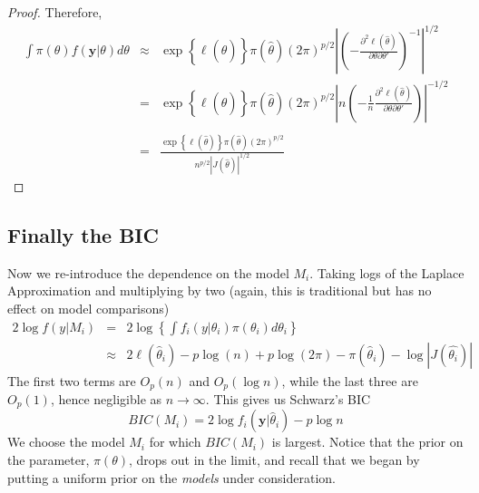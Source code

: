 \documentclass[12pt]{article}
\theoremstyle{definition}
\begin{document}
\begin{proof}
Therefore,
	\begin{eqnarray*}
		\int \pi(\theta)f(\mathbf{y}|\theta)d\theta &\approx& \exp\left\{ \ell(\hat{\theta}) \right\}\pi(\hat{\theta}) \left(2\pi\right)^{p/2}\left| \left(-\frac{\partial^2 \ell(\hat{\theta})}{\partial \theta \partial \theta'}\right)^{-1} \right|^{1/2}\\
		&=&  \exp\left\{ \ell(\hat{\theta}) \right\}\pi(\hat{\theta}) \left(2\pi\right)^{p/2}\left|n \left(-\frac{1}{n}\frac{\partial^2 \ell(\hat{\theta})}{\partial \theta \partial \theta'}\right) \right|^{-1/2}\\\\
		&=&\frac{ \exp\left\{ \ell(\hat{\theta}) \right\}\pi(\hat{\theta}) \left(2\pi\right)^{p/2}}{n^{p/2}\left| J(\hat{\theta}) \right|^{1/2}}
	\end{eqnarray*}
\end{proof}


\subsection{Finally the BIC}
Now we re-introduce the dependence on the model $M_i$. Taking logs of the Laplace Approximation and multiplying by two (again, this is traditional but has no effect on model comparisons)
	\begin{eqnarray*}
		2 \log f(y|M_i) &=& 2 \log \left\{ \int f_i(y|\theta_i)\pi(\theta_i)d\theta_i \right\}\\
		&\approx& 2\ell(\hat{\theta}_i) -p\log(n) + p \log(2\pi)- \pi(\hat{\theta}_i)-\log \left| J(\hat{\theta_i}) \right|
	\end{eqnarray*}
The first two terms are $O_p(n)$ and $O_p(\log{n})$, while the last three are $O_p(1)$, hence negligible as $n\rightarrow \infty$. This gives us Schwarz's BIC
	$$BIC(M_i) = 2\log{f_i(\mathbf{y}|\hat{\theta}_i)} - p\log{n}$$
We choose the model $M_i$ for which $BIC(M_i)$ is largest. Notice that the prior on the parameter, $\pi(\theta)$, drops out in the limit, and recall that we began by putting a uniform prior on the \emph{models} under consideration. 
\end{document}
